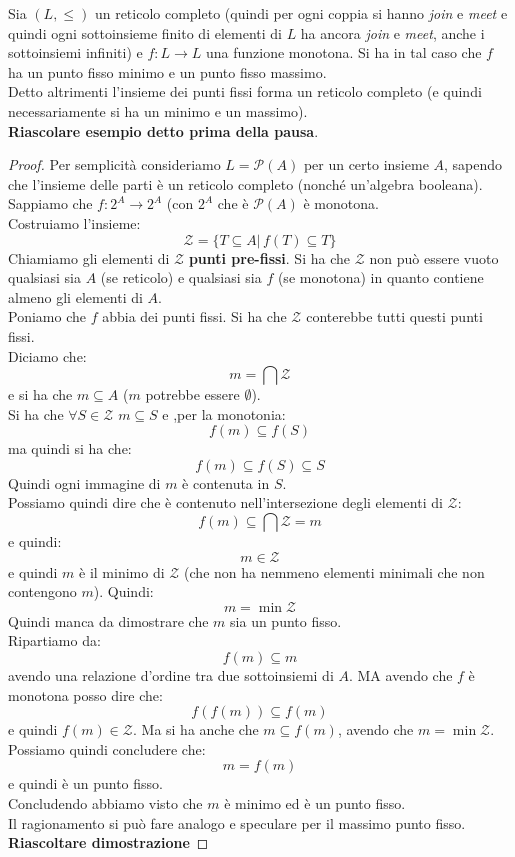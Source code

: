 \documentclass[a4paper,12pt, oneside]{book}
\begin{document}
\begin{teorema}
  Sia $(L,\leq)$ un reticolo completo (quindi per ogni coppia si hanno
  \textit{join} e \textit{meet} e quindi ogni sottoinsieme finito di elementi di
  $L$ ha ancora \textit{join} e \textit{meet}, anche i sottoinsiemi infiniti) e
  $f:L\to L$ una funzione monotona. Si ha 
  in tal caso che $f$ ha un punto fisso minimo e un punto fisso massimo.\\
  Detto altrimenti l'insieme dei punti fissi forma un reticolo completo (e
  quindi necessariamente si ha un minimo e un massimo).\\
  \textbf{Riascolare esempio detto prima della pausa}.
\end{teorema}
\begin{proof}
  Per semplicità consideriamo $L=\mathcal{P}(A)$ per un certo insieme $A$,
  sapendo che l'insieme delle parti è un reticolo completo (nonché un'algebra
  booleana).\\
  Sappiamo che $f:2^A\to 2^A$ (con $2^A$ che è $\mathcal{P}(A)$ è monotona.\\
  Costruiamo l'insieme:
  \[\mathcal{Z}=\{T\subseteq A|\,f(T)\subseteq T\}\]
  Chiamiamo gli elementi di $\mathcal{Z}$ \textbf{punti pre-fissi}. Si ha che
  $\mathcal{Z}$ non può essere vuoto qualsiasi sia $A$ (se reticolo) e qualsiasi
  sia $f$ (se monotona) in quanto contiene almeno gli elementi di $A$.\\
  Poniamo che $f$ abbia dei punti fissi. Si ha che $\mathcal{Z}$ conterebbe
  tutti questi punti fissi. \\
  Diciamo che:
  \[m=\bigcap \mathcal{Z}\]
  e si ha che $m\subseteq A$ ($m$ potrebbe essere $\emptyset$).\\
  Si ha che $\forall S\in \mathcal{Z}$ $m\subseteq S$ e ,per la monotonia: 
  \[f(m)\subseteq f(S)\]
  ma quindi si ha che:
  \[f(m)\subseteq f(S)\subseteq S\]
  Quindi ogni immagine di $m$ è contenuta in $S$.\\
  Possiamo quindi dire che è contenuto nell'intersezione degli elementi di
  $\mathcal{Z}$: 
  \[f(m)\subseteq\bigcap \mathcal{Z}=m\]
  e quindi:
  \[m\in \mathcal{Z}\]
  e quindi $m$ è il minimo di $\mathcal{Z}$ (che non ha nemmeno elementi
  minimali che non contengono $m$). Quindi:
  \[m=\min\mathcal{Z}\]
  Quindi manca da dimostrare che $m$ sia un punto fisso.\\
  Ripartiamo da:
  \[f(m)\subseteq m\]
  avendo una relazione d'ordine tra due sottoinsiemi di $A$. MA avendo che $f$ è
  monotona posso dire che:
  \[f(f(m))\subseteq f(m)\]
  e quindi $f(m)\in \mathcal{Z}$. Ma si ha anche che $m\subseteq f(m)$, avendo
  che $m=\min\mathcal{Z}$. Possiamo quindi concludere che:
  \[m=f(m)\]
  e quindi è un punto fisso.\\
  Concludendo abbiamo visto che $m$ è minimo ed è un punto fisso.\\
  Il ragionamento si può fare analogo e speculare per il massimo punto fisso.\\
  \textbf{Riascoltare dimostrazione}
\end{proof}
\end{document}
